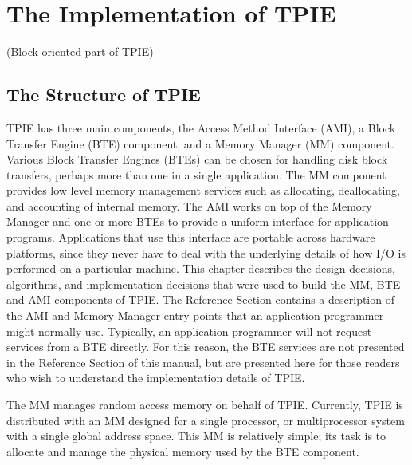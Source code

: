 \chapter{The Implementation of TPIE}

\tobewritten(Block oriented part of TPIE)

\section{The Structure of TPIE}
 

TPIE has three main components, the Access Method Interface
(AMI), a Block Transfer Engine
(BTE) component, and a Memory Manager
(MM) component. Various Block Transfer Engines
(BTEs) can be chosen for handling disk block transfers, perhaps more
than one in a single application.  The MM
component provides low level memory management services such as
allocating, deallocating, and accounting of internal memory. The AMI
works on top of the Memory Manager and one or more BTEs to provide a
uniform interface for application programs. Applications that use this
interface are portable across hardware platforms, since they never
have to deal with the underlying details of how I/O is performed on a
particular machine. This chapter describes the design decisions,
algorithms, and implementation decisions that were used to build the
MM, BTE and AMI components of TPIE. The Reference Section contains a
description of the AMI and Memory Manager entry points that an
application programmer might normally use. Typically, an application
programmer will not request services from a BTE directly. For this
reason, the BTE services are not presented in the Reference Section of
this manual, but are presented here for those readers who wish to
understand the implementation details of TPIE.



The MM manages random access memory on behalf of
TPIE.
Currently, TPIE is distributed with an MM designed for a single
processor, or multiprocessor system with a single global address
space. This MM is relatively simple; its task is to allocate and
manage the physical memory used by the BTE component.

